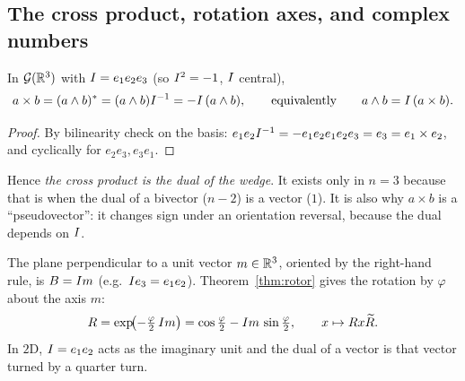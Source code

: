 \subsection{The cross product, rotation axes, and complex numbers}

\begin{proposition}\label{prop:cross}
In $\mathcal{G}(\mathbb{R}^3)$ with $I=e_1e_2e_3$ (so $I^2=-1$, $I$ central),
\[
 a\times b=(a\wedge b)^{\ast}=(a\wedge b)I^{-1}=-I\,(a\wedge b),\qquad\text{equivalently}\qquad a\wedge b=I\,(a\times b).
\]
\end{proposition}
\begin{proof}
By bilinearity check on the basis: $e_1e_2I^{-1}=-e_1e_2e_1e_2e_3=e_3=e_1\times e_2$, and cyclically for $e_2e_3,e_3e_1$.
\end{proof}

Hence \emph{the cross product is the dual of the wedge}. It exists only in $n=3$ because that is when the dual of a bivector ($n-2$) is a vector ($1$). It is also why $a\times b$ is a ``pseudovector'': it changes sign under an orientation reversal, because the dual depends on $I$.

\begin{example}
The plane perpendicular to a unit vector $m\in\mathbb{R}^3$, oriented by the right-hand rule, is $B=I m$ (e.g.\ $I e_3=e_1e_2$). Theorem~\ref{thm:rotor} gives the rotation by $\varphi$ about the axis $m$:
\[
 R=\exp\!\bigl(-\tfrac\varphi2\,I m\bigr)=\cos\tfrac\varphi2-I m\,\sin\tfrac\varphi2,\qquad x\mapsto Rx\widetilde{R} .
\]
In $2$D, $I=e_1e_2$ acts as the imaginary unit and the dual of a vector is that vector turned by a quarter turn.
\end{example}
